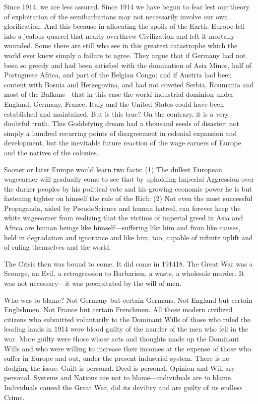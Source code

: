 \documentclass[letterpaper,10pt,english]{jupyterBook}
\begin{document}
\sphinxAtStartPar
Since 1914, we are less assured. Since 1914 we have begun to fear lest our theory of exploitation of the semi\sphinxhyphen{}barbarians may not necessarily involve our own glorification. And this because in allocating the spoils of the Earth, Europe fell into a jealous quarrel that nearly overthrew Civilization and left it mortally wounded. Some there are still who see in this greatest catastrophe which the world ever knew simply a failure to agree. They argue that if Germany had not been so greedy and had been satisfied with the domination of Asia Minor, half of Portuguese Africa, and part of the Belgian Congo; and if Austria had been content with Bosnia and Herzegovina, and had not coveted Serbia, Roumania and most of the Balkans—that in this case the world industrial dominion under England, Germany, France, Italy and the United States could have been established and maintained. But is this true? On the contrary, it is a very doubtful truth. This God\sphinxhyphen{}defying dream had a thousand seeds of disaster: not simply a hundred recurring points of disagreement in colonial expansion and development, but the inevitable future reaction of the wage earners of Europe and the natives of the colonies.

\sphinxAtStartPar
Sooner or later Europe would learn two facts: (1) The dullest European wage\sphinxhyphen{}earner will gradually come to see that by upholding Imperial Aggression over the darker peoples by his political vote and his growing economic power he is but fastening tighter on himself the rule of the Rich; (2) Not even the most successful Propaganda, aided by Pseudo\sphinxhyphen{}Science and human hatred, can forever keep the white wage\sphinxhyphen{}earner from realizing that the victims of imperial greed in Asia and Africa are human beings like himself—suffering like him and from like causes, held in degradation and ignorance and like him, too, capable of infinite uplift and of ruling themselves and the world.

\sphinxAtStartPar
The Crisis then was bound to come. It did come in 1914\sphinxhyphen{}18. The Great War was a Scourge, an Evil, a retrogression to Barbarism, a waste, a wholesale murder. It was not necessary—it was precipitated by the will of men.

\sphinxAtStartPar
Who was to blame? Not Germany but certain Germans. Not England but certain Englishmen. Not France but certain Frenchmen. All those modern civilized citizens who submitted voluntarily to the Dominant Wills of those who ruled the leading lands in 1914 were blood guilty of the murder of the men who fell in the war. More guilty were those whose acts and thoughts made up the Dominant Wills and who were willing to increase their incomes at the expense of those who suffer in Europe and out, under the present industrial system. There is no dodging the issue. Guilt is personal. Deed is personal, Opinion and Will are personal. Systems and Nations are not to blame—individuals are to blame. Individuals caused the Great War, did its deviltry and are guilty of its endless Crime.
\end{document}
